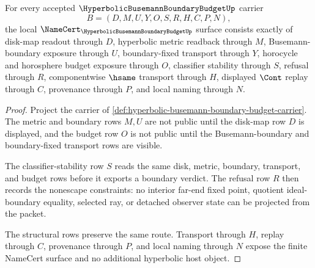 \begin{theorem}
\label{thm:hyperbolic-busemann-boundary-budget-namecert-obligations}
For every accepted $\HyperbolicBusemannBoundaryBudgetUp$ carrier
$$
B=(D,M,U,Y,O,S,R,H,C,P,N),
$$
the local $\NameCert_{\HyperbolicBusemannBoundaryBudgetUp}$ surface consists exactly of disk-map readout through $D$, hyperbolic metric readback through $M$, Busemann-boundary exposure through $U$, boundary-fixed transport through $Y$, horocycle and horosphere budget exposure through $O$, classifier stability through $S$, refusal through $R$, componentwise $\hsame$ transport through $H$, displayed $\Cont$ replay through $C$, provenance through $P$, and local naming through $N$.
\end{theorem}
\begin{proof}
Project the carrier of \autoref{def:hyperbolic-busemann-boundary-budget-carrier}. The metric and boundary rows $M,U$ are not public until the disk-map row $D$ is displayed, and the budget row $O$ is not public until the Busemann-boundary and boundary-fixed transport rows are visible.

The classifier-stability row $S$ reads the same disk, metric, boundary, transport, and budget rows before it exports a boundary verdict. The refusal row $R$ then records the nonescape constraints: no interior far-end fixed point, quotient ideal-boundary equality, selected ray, or detached observer state can be projected from the packet.

The structural rows preserve the same route. Transport through $H$, replay through $C$, provenance through $P$, and local naming through $N$ expose the finite NameCert surface and no additional hyperbolic host object.
\end{proof}

